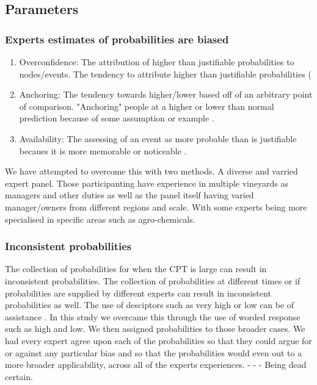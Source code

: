 \subsection{Parameters}
\subsubsection{Experts estimates of probabilities are biased}
\begin{enumerate}
        \item Overconfidence: The attribution of higher than justifiable probabilities to nodes/events.
        \indent The tendency to attribute higher than justifiable probabilities (\citep{lichtensteinCalibrationProbabilitiesState1982} 
        \item Anchoring: The tendency towards higher/lower based off of an arbitrary point of comparison. "Anchoring" people at a higher or lower than normal prediction because of some assumption or example  \citep{kahnemanPsychologyPrediction1973}.
        \item Availability: The assessing of an event as more probable than is justifiable becaues it is more memorable or noticeable \citep{tverskyJudgmentUncertaintyHeuristics1974}.

\end{enumerate}
We have attempted to overcome this with two methods. A diverse and varried expert panel. Those participanting have experience in multiple vineyards as managers and other duties as well as the panel itself having varied manager/owners from different regions and scale. With some experts being more specialised in specific areas such as agro-chemicals.
\subsubsection{Inconsistent probabilities}
The collection of probabilities for when the CPT is large can result in inconsistent probabilities. The collection of probabilities at different times or if probabilities are supplied by different experts can result in inconsistent probabilities as well.
The use of desciptors such as very high or low can be of assistance \cite{vandergaag2013elicit}. In this study we overcame this through the use of worded response such as high and low. We then assigned probabilities to those broader cases. We had every expert agree upon each of the probabilities so that they could argue for or against any particular bias and so that the probabilities would even out to a more broader applicability, across all of the experts experiences.
-       -       - Being dead certain.
